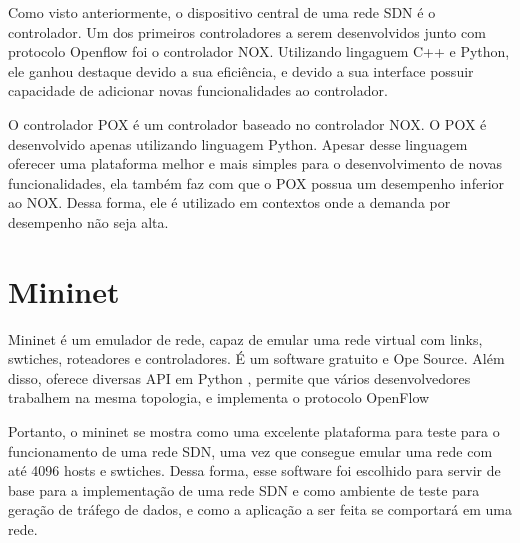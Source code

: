 Como visto anteriormente, o dispositivo central de uma rede SDN é o controlador. Um dos primeiros controladores a serem desenvolvidos junto com protocolo Openflow foi o controlador NOX. Utilizando lingaguem C++ e Python, ele ganhou destaque devido a sua eficiência, e devido a sua interface possuir capacidade de adicionar novas funcionalidades ao controlador.

O controlador POX é um controlador baseado no controlador NOX. O POX é desenvolvido apenas utilizando linguagem Python. Apesar desse linguagem oferecer uma plataforma melhor e mais simples para o desenvolvimento de novas funcionalidades, ela também faz com que o POX possua um desempenho inferior ao NOX. Dessa forma, ele é utilizado em contextos onde a demanda por desempenho não seja alta.

\section{Mininet}

Mininet é um emulador de rede, capaz de emular uma rede virtual com links, swtiches, roteadores e controladores. É um software gratuito e Ope Source. Além disso, oferece diversas API em Python , permite que vários desenvolvedores trabalhem na mesma topologia, e implementa o protocolo OpenFlow

Portanto, o mininet se mostra como uma excelente plataforma para teste para o funcionamento de uma rede SDN, uma vez que consegue emular uma rede com até 4096 hosts e swtiches. Dessa forma, esse software foi escolhido para servir de base para a implementação de uma rede SDN e como ambiente de teste para geração de tráfego de dados, e como a aplicação a ser feita se comportará em uma rede.\cite{Mininet}





















